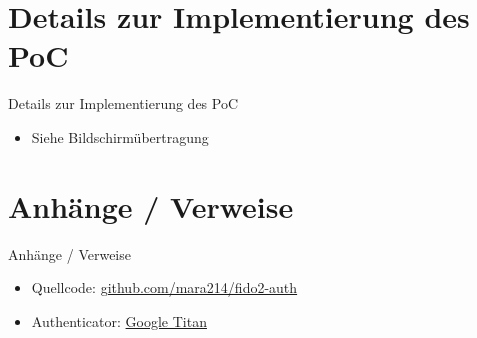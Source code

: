 \documentclass{beamer}
\begin{document}
\section{Details zur Implementierung des PoC}
\begin{frame}{Details zur Implementierung des PoC}
	\begin{itemize}
		\item Siehe Bildschirmübertragung
	\end{itemize}
\end{frame}

\section{Anhänge / Verweise}
\begin{frame}{Anhänge / Verweise}
	\begin{itemize}
		\item Quellcode: \href{https://github.com/mara214/fido2-auth}{github.com/mara214/fido2-auth}
		\item Authenticator: \href{https://store.google.com/de/product/titan_security_key?pli=1&hl=de}{Google Titan}
	\end{itemize}
\end{frame}
\end{document}
